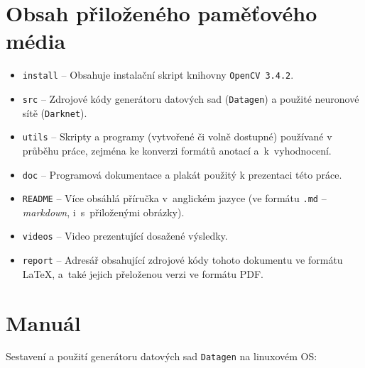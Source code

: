 
\chapter{Obsah přiloženého paměťového média}

\begin{itemize}
    \item \texttt{install} -- Obsahuje instalační skript knihovny \texttt{OpenCV 3.4.2}.
    \item \texttt{src} -- Zdrojové kódy generátoru datových sad (\texttt{Datagen}) a použité neuronové sítě (\texttt{Darknet}).
    \item \texttt{utils} -- Skripty a programy (vytvořené či volně dostupné) používané v průběhu práce, zejména ke konverzi formátů anotací a~k~vyhodnocení.
    \item \texttt{doc} -- Programová dokumentace a plakát použitý k prezentaci této práce.
    \item \texttt{README} -- Více obsáhlá příručka v~anglickém jazyce (ve formátu \texttt{.md} -- \emph{markdown}, i~s~přiloženými obrázky).
    \item \texttt{videos} -- Video prezentující dosažené výsledky.
    \item \texttt{report} -- Adresář obsahující zdrojové kódy tohoto dokumentu ve formátu \LaTeX, a~také jejich přeloženou verzi ve formátu PDF.
\end{itemize}


\chapter{Manuál}

Sestavení a použití generátoru datových sad \texttt{Datagen} na linuxovém OS:

